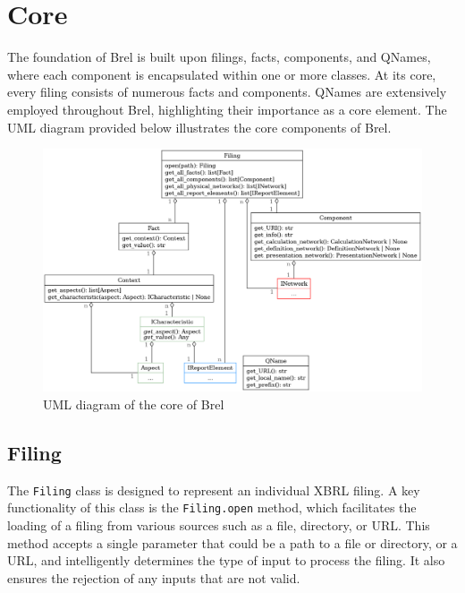 \section{Core}

The foundation of Brel is built upon filings, facts, components, and QNames, where each component is encapsulated within one or more classes.
At its core, every filing consists of numerous facts and components.
QNames are extensively employed throughout Brel, highlighting their importance as a core element.
The UML diagram provided below illustrates the core components of Brel.

\begin{figure}[H]
    \centering
    \includegraphics[width=\textwidth]{images/brel_core_classes.png}
    \caption{UML diagram of the core of Brel}
    \label{fig:brel_core_classes}
\end{figure}

\subsection{Filing}
\label{subsec:filing}

The \texttt{Filing} class is designed to represent an individual XBRL filing.
A key functionality of this class is the \texttt{Filing.open} method, which facilitates the loading of a filing from various sources such as a file, directory, or URL.
This method accepts a single parameter that could be a path to a file or directory, or a URL, and intelligently determines the type of input to process the filing.
It also ensures the rejection of any inputs that are not valid.

